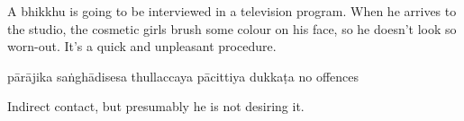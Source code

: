 \begin{exam}{\autoExamName}
\begin{problem*}
\begin{parts}
  \bigskip

  \item A bhikkhu is going to be interviewed in a television program. When he
    arrives to the studio, the cosmetic girls brush some colour on his face, so he
    doesn't look so worn-out. It's a quick and unpleasant procedure.

  \bigskip

  \begin{answers}{6}
    \bChoices
     pārājika\eAns
     saṅghādisesa\eAns
     thullaccaya\eAns
     pācittiya\eAns
     dukkaṭa\eAns
     no offences\eAns
    \eChoices
  \end{answers}

  \begin{solution}
    Indirect contact, but presumably he is not desiring it.
  \end{solution}

  \end{parts}

\end{problem*}

\end{exam}
